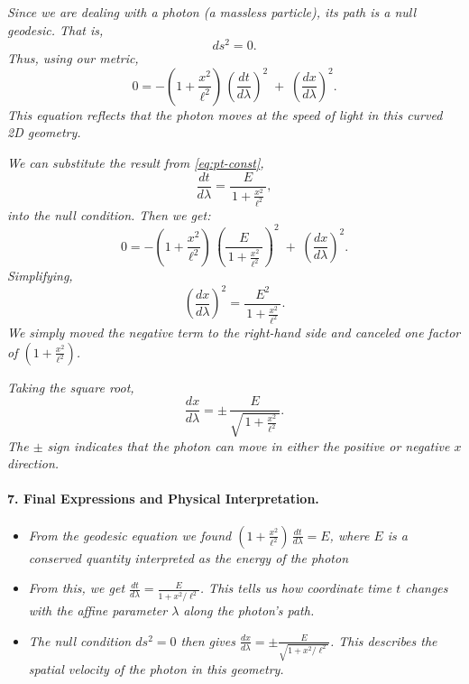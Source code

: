 \textit{Since we are dealing with a photon (a massless particle), its path is a \emph{null} geodesic. That is,}
\[
ds^2 = 0.
\]
\textit{Thus, using our metric,}
\begin{equation*}
0
= -\left(1 + \frac{x^2}{\ell^2}\right)\,\left(\frac{dt}{d\lambda}\right)^2
\;+\;
\left(\frac{dx}{d\lambda}\right)^2.
\end{equation*}
\textit{This equation reflects that the photon moves at the speed of light in this curved 2D geometry.}

\textit{We can substitute the result from \eqref{eq:pt-const},}
\[
\frac{dt}{d\lambda}
= \frac{E}{\,1 + \frac{x^2}{\ell^2}\,},
\]
\textit{into the null condition. Then we get:}
\[
0
= -\left(1 + \frac{x^2}{\ell^2}\right)\,
 \left(\frac{E}{\,1 + \frac{x^2}{\ell^2}\,}\right)^2
\;+\;
\left(\frac{dx}{d\lambda}\right)^2.
\]
\textit{Simplifying,}
\[
\left(\frac{dx}{d\lambda}\right)^2
= \frac{E^2}{\,1 + \frac{x^2}{\ell^2}\,}.
\]
\textit{We simply moved the negative term to the right-hand side and canceled one factor of \((1 + \frac{x^2}{\ell^2})\).}

\textit{Taking the square root,}
\begin{equation*}
\frac{dx}{d\lambda}
= \pm\,\frac{E}{\sqrt{\,1 + \frac{x^2}{\ell^2}\,}}.
\end{equation*}
\textit{The \(\pm\) sign indicates that the photon can move in either the positive or negative \(x\) direction.}

\paragraph{7. Final Expressions and Physical Interpretation.}

\begin{itemize}
\item \textit{From the geodesic equation we found \(\displaystyle \left(1 + \frac{x^2}{\ell^2}\right)\,\frac{dt}{d\lambda} = E\), where \(E\) is a \emph{conserved} quantity interpreted as the energy of the photon}
\item \textit{From this, we get \(\displaystyle \frac{dt}{d\lambda} = \frac{E}{1 + x^2/\ell^2}\). \emph{This tells us how coordinate time \(t\) changes with the affine parameter \(\lambda\) along the photon's path.}}
\item \textit{The null condition \(ds^2 = 0\) then gives \(\displaystyle \frac{dx}{d\lambda} = \pm \frac{E}{\sqrt{1 + x^2/\ell^2}}\). \emph{This describes the spatial velocity of the photon in this geometry.}}
\end{itemize}


